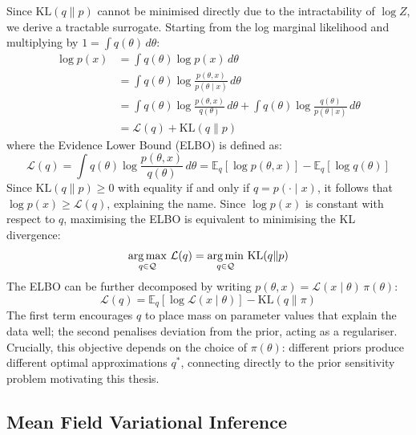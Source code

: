     Since $\mathrm{KL}(q \| p)$ cannot be minimised directly due to the intractability of $\log Z$, we derive a tractable surrogate. Starting from the log marginal likelihood and multiplying by $1 = \int q(\theta)\, d\theta$:
    \begin{align}
        \log p(x) &= \int q(\theta) \log p(x)\, d\theta \nonumber \\
        &= \int q(\theta) \log \frac{p(\theta, x)}{p(\theta \mid x)}\, d\theta \nonumber \\
        &= \int q(\theta) \log \frac{p(\theta, x)}{q(\theta)}\, d\theta + \int q(\theta) \log \frac{q(\theta)}{p(\theta \mid x)}\, d\theta \nonumber \\
        &= \mathcal{L}(q) + \mathrm{KL}(q \| p)
    \end{align}
    where the Evidence Lower Bound (ELBO) is defined as:
    \begin{equation}
        \mathcal{L}(q) = \int q(\theta) \log \frac{p(\theta, x)}{q(\theta)}\, d\theta = \mathbb{E}_{q}\left[\log p(\theta, x)\right] - \mathbb{E}_{q}\left[\log q(\theta)\right]
    \end{equation}
    Since $\mathrm{KL}(q \| p) \geq 0$ with equality if and only if $q = p(\cdot \mid x)$, it follows that $\log p(x) \geq \mathcal{L}(q)$, explaining the name. Since $\log p(x)$ is constant with respect to $q$, maximising the ELBO is equivalent to minimising the KL divergence:
    \begin{equation}
        \operatorname*{arg\,max}_{q \in \mathcal{Q}}\, \mathcal{L}(q) = \operatorname*{arg\,min}_{q \in \mathcal{Q}}\, \mathrm{KL}(q \| p)
    \end{equation}
    The ELBO can be further decomposed by writing $p(\theta, x) = \mathcal{L}(x \mid \theta)\, \pi(\theta)$:
    \begin{equation}
        \mathcal{L}(q) = \mathbb{E}_{q}\left[\log \mathcal{L}(x \mid \theta)\right] - \mathrm{KL}(q \| \pi)
    \end{equation}
    The first term encourages $q$ to place mass on parameter values that explain the data well; the second penalises deviation from the prior, acting as a regulariser. Crucially, this objective depends on the choice of $\pi(\theta)$: different priors produce different optimal approximations $q^*$, connecting directly to the prior sensitivity problem motivating this thesis.

    \subsection{Mean Field Variational Inference}

